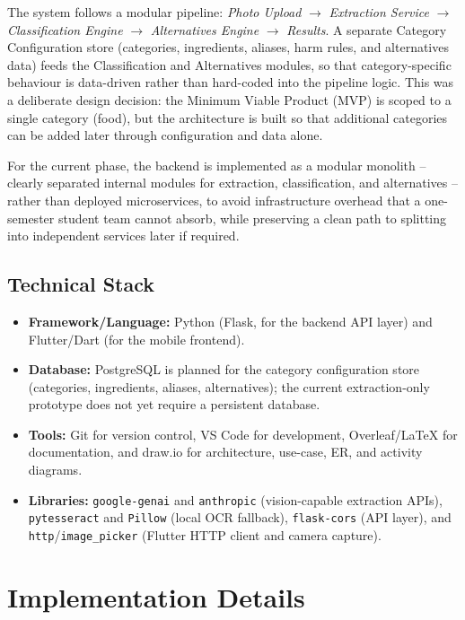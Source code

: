 \documentclass{report}
\begin{document}
The system follows a modular pipeline: \emph{Photo Upload} $\rightarrow$
\emph{Extraction Service} $\rightarrow$ \emph{Classification Engine}
$\rightarrow$ \emph{Alternatives Engine} $\rightarrow$ \emph{Results}. A
separate Category Configuration store (categories, ingredients, aliases,
harm rules, and alternatives data) feeds the Classification and
Alternatives modules, so that category-specific behaviour is
data-driven rather than hard-coded into the pipeline logic. This was a
deliberate design decision: the Minimum Viable Product (MVP) is scoped to
a single category (food), but the architecture is built so that
additional categories can be added later through configuration and data
alone.

For the current phase, the backend is implemented as a modular
monolith -- clearly separated internal modules for extraction,
classification, and alternatives -- rather than deployed microservices,
to avoid infrastructure overhead that a one-semester student team cannot
absorb, while preserving a clean path to splitting into independent
services later if required.

\subsection{Technical Stack}

\begin{itemize}
  \item \textbf{Framework/Language:} Python (Flask, for the backend API
    layer) and Flutter/Dart (for the mobile frontend).
  \item \textbf{Database:} PostgreSQL is planned for the category
    configuration store (categories, ingredients, aliases, alternatives);
    the current extraction-only prototype does not yet require a
    persistent database.
  \item \textbf{Tools:} Git for version control, VS Code for development,
    Overleaf/\LaTeX{} for documentation, and draw.io for architecture,
    use-case, ER, and activity diagrams.
  \item \textbf{Libraries:} \texttt{google-genai} and \texttt{anthropic}
    (vision-capable extraction APIs), \texttt{pytesseract} and
    \texttt{Pillow} (local OCR fallback), \texttt{flask-cors} (API
    layer), and \texttt{http}/\texttt{image\_picker} (Flutter HTTP
    client and camera capture).
\end{itemize}

\section{Implementation Details}
\end{document}
